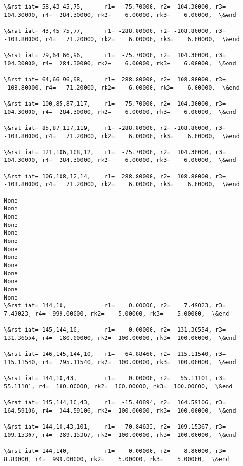 \documentclass[11pt]{article}
\begin{document}
\begin{Verbatim}[commandchars=\\\{\}]
\&rst iat= 58,43,45,75,      r1=  -75.70000, r2=  104.30000, r3=  104.30000, r4=  284.30000, rk2=    6.00000, rk3=    6.00000,  \&end

\&rst iat= 43,45,75,77,      r1= -288.80000, r2= -108.80000, r3= -108.80000, r4=   71.20000, rk2=    6.00000, rk3=    6.00000,  \&end

\&rst iat= 79,64,66,96,      r1=  -75.70000, r2=  104.30000, r3=  104.30000, r4=  284.30000, rk2=    6.00000, rk3=    6.00000,  \&end

\&rst iat= 64,66,96,98,      r1= -288.80000, r2= -108.80000, r3= -108.80000, r4=   71.20000, rk2=    6.00000, rk3=    6.00000,  \&end

\&rst iat= 100,85,87,117,    r1=  -75.70000, r2=  104.30000, r3=  104.30000, r4=  284.30000, rk2=    6.00000, rk3=    6.00000,  \&end

\&rst iat= 85,87,117,119,    r1= -288.80000, r2= -108.80000, r3= -108.80000, r4=   71.20000, rk2=    6.00000, rk3=    6.00000,  \&end

\&rst iat= 121,106,108,12,   r1=  -75.70000, r2=  104.30000, r3=  104.30000, r4=  284.30000, rk2=    6.00000, rk3=    6.00000,  \&end

\&rst iat= 106,108,12,14,    r1= -288.80000, r2= -108.80000, r3= -108.80000, r4=   71.20000, rk2=    6.00000, rk3=    6.00000,  \&end

None
None
None
None
None
None
None
None
None
None
None
None
None
\&rst iat= 144,10,           r1=    0.00000, r2=    7.49023, r3=    7.49023, r4=  999.00000, rk2=    5.00000, rk3=    5.00000,  \&end

\&rst iat= 145,144,10,       r1=    0.00000, r2=  131.36554, r3=  131.36554, r4=  180.00000, rk2=  100.00000, rk3=  100.00000,  \&end

\&rst iat= 146,145,144,10,   r1=  -64.88460, r2=  115.11540, r3=  115.11540, r4=  295.11540, rk2=  100.00000, rk3=  100.00000,  \&end

\&rst iat= 144,10,43,        r1=    0.00000, r2=   55.11101, r3=   55.11101, r4=  180.00000, rk2=  100.00000, rk3=  100.00000,  \&end

\&rst iat= 145,144,10,43,    r1=  -15.40894, r2=  164.59106, r3=  164.59106, r4=  344.59106, rk2=  100.00000, rk3=  100.00000,  \&end

\&rst iat= 144,10,43,101,    r1=  -70.84633, r2=  109.15367, r3=  109.15367, r4=  289.15367, rk2=  100.00000, rk3=  100.00000,  \&end

\&rst iat= 144,140,          r1=    0.00000, r2=    8.80000, r3=    8.80000, r4=  999.00000, rk2=    5.00000, rk3=    5.00000,  \&end


\end{Verbatim}
\end{document}
